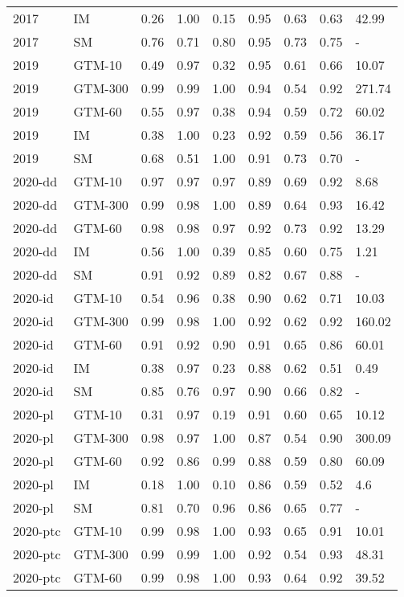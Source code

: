 \begin{tabular}{llrrrrrrl}
2017 & IM & 0.26 & 1.00 & 0.15 & 0.95 & 0.63 & 0.63 & 42.99 \\
2017 & SM & 0.76 & 0.71 & 0.80 & 0.95 & 0.73 & 0.75 & - \\
2019 & GTM-10 & 0.49 & 0.97 & 0.32 & 0.95 & 0.61 & 0.66 & 10.07 \\
2019 & GTM-300 & 0.99 & 0.99 & 1.00 & 0.94 & 0.54 & 0.92 & 271.74 \\
2019 & GTM-60 & 0.55 & 0.97 & 0.38 & 0.94 & 0.59 & 0.72 & 60.02 \\
2019 & IM & 0.38 & 1.00 & 0.23 & 0.92 & 0.59 & 0.56 & 36.17 \\
2019 & SM & 0.68 & 0.51 & 1.00 & 0.91 & 0.73 & 0.70 & - \\
2020-dd & GTM-10 & 0.97 & 0.97 & 0.97 & 0.89 & 0.69 & 0.92 & 8.68 \\
2020-dd & GTM-300 & 0.99 & 0.98 & 1.00 & 0.89 & 0.64 & 0.93 & 16.42 \\
2020-dd & GTM-60 & 0.98 & 0.98 & 0.97 & 0.92 & 0.73 & 0.92 & 13.29 \\
2020-dd & IM & 0.56 & 1.00 & 0.39 & 0.85 & 0.60 & 0.75 & 1.21 \\
2020-dd & SM & 0.91 & 0.92 & 0.89 & 0.82 & 0.67 & 0.88 & - \\
2020-id & GTM-10 & 0.54 & 0.96 & 0.38 & 0.90 & 0.62 & 0.71 & 10.03 \\
2020-id & GTM-300 & 0.99 & 0.98 & 1.00 & 0.92 & 0.62 & 0.92 & 160.02 \\
2020-id & GTM-60 & 0.91 & 0.92 & 0.90 & 0.91 & 0.65 & 0.86 & 60.01 \\
2020-id & IM & 0.38 & 0.97 & 0.23 & 0.88 & 0.62 & 0.51 & 0.49 \\
2020-id & SM & 0.85 & 0.76 & 0.97 & 0.90 & 0.66 & 0.82 & - \\
2020-pl & GTM-10 & 0.31 & 0.97 & 0.19 & 0.91 & 0.60 & 0.65 & 10.12 \\
2020-pl & GTM-300 & 0.98 & 0.97 & 1.00 & 0.87 & 0.54 & 0.90 & 300.09 \\
2020-pl & GTM-60 & 0.92 & 0.86 & 0.99 & 0.88 & 0.59 & 0.80 & 60.09 \\
2020-pl & IM & 0.18 & 1.00 & 0.10 & 0.86 & 0.59 & 0.52 & 4.6 \\
2020-pl & SM & 0.81 & 0.70 & 0.96 & 0.86 & 0.65 & 0.77 & - \\
2020-ptc & GTM-10 & 0.99 & 0.98 & 1.00 & 0.93 & 0.65 & 0.91 & 10.01 \\
2020-ptc & GTM-300 & 0.99 & 0.99 & 1.00 & 0.92 & 0.54 & 0.93 & 48.31 \\
2020-ptc & GTM-60 & 0.99 & 0.98 & 1.00 & 0.93 & 0.64 & 0.92 & 39.52 \\

\end{tabular}
